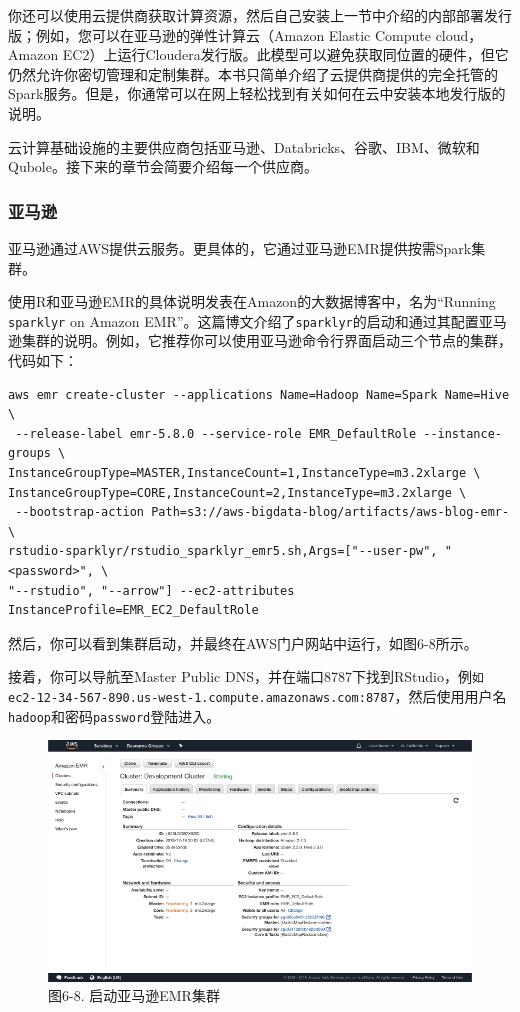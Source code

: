 \documentclass[
]{article}
\begin{document}
你还可以使用云提供商获取计算资源，然后自己安装上一节中介绍的内部部署发行版；例如，您可以在亚马逊的弹性计算云（Amazon
Elastic Compute cloud，Amazon
EC2）上运行Cloudera发行版。此模型可以避免获取同位置的硬件，但它仍然允许你密切管理和定制集群。本书只简单介绍了云提供商提供的完全托管的Spark服务。但是，你通常可以在网上轻松找到有关如何在云中安装本地发行版的说明。

云计算基础设施的主要供应商包括亚马逊、Databricks、谷歌、IBM、微软和Qubole。接下来的章节会简要介绍每一个供应商。

\hypertarget{ux4e9aux9a6cux900a}{%
\subsubsection{亚马逊}\label{ux4e9aux9a6cux900a}}

亚马逊通过AWS提供云服务。更具体的，它通过亚马逊EMR提供按需Spark集群。

使用R和亚马逊EMR的具体说明发表在Amazon的大数据博客中，名为``Running
\texttt{sparklyr} on Amazon
EMR''。这篇博文介绍了\texttt{sparklyr}的启动和通过其配置亚马逊集群的说明。例如，它推荐你可以使用亚马逊命令行界面启动三个节点的集群，代码如下：

\begin{verbatim}
aws emr create-cluster --applications Name=Hadoop Name=Spark Name=Hive \
 --release-label emr-5.8.0 --service-role EMR_DefaultRole --instance-groups \
InstanceGroupType=MASTER,InstanceCount=1,InstanceType=m3.2xlarge \
InstanceGroupType=CORE,InstanceCount=2,InstanceType=m3.2xlarge \
 --bootstrap-action Path=s3://aws-bigdata-blog/artifacts/aws-blog-emr-\
rstudio-sparklyr/rstudio_sparklyr_emr5.sh,Args=["--user-pw", "<password>", \
"--rstudio", "--arrow"] --ec2-attributes InstanceProfile=EMR_EC2_DefaultRole
\end{verbatim}

然后，你可以看到集群启动，并最终在AWS门户网站中运行，如图6-8所示。

接着，你可以导航至Master Public
DNS，并在端口8787下找到RStudio，例\texttt{如ec2-12-34-567-890.us-west-1.compute.amazonaws.com:8787}，然后使用用户名\texttt{hadoop}和密码\texttt{password}登陆进入。

\begin{figure}
\centering
\includegraphics{figures/6_8.png}
\caption{图6-8. 启动亚马逊EMR集群}
\end{figure}
\end{document}
